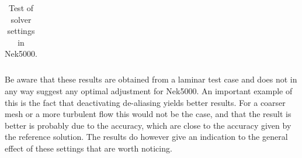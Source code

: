 \begin{table}[h]
\begin{tabular}{c | c c c c c c | c c }
    \end{tabular}
    \caption{Test of solver settings in Nek5000.}
    \label{tab:perf}
\end{table}
%

Be aware that these results are obtained from a laminar test case and does not in any way 
suggest any optimal adjustment for Nek5000. An important example of this is the fact that 
deactivating de-aliasing yields better results. For a coarser mesh or a more turbulent flow 
this would not be the case, and that the result is better is probably due to 
the accuracy, which are close to the accuracy given by the reference solution. 
The results do however give an indication to the general effect of these settings that 
are worth noticing.

